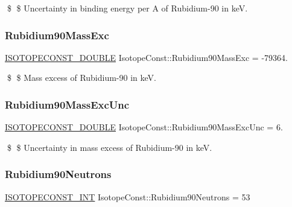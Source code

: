 \$ \$ Uncertainty in binding energy per A of Rubidium-\/90 in keV. \mbox{\label{group___isotope_const-_rubidium-_rb90_gaec19844685c3464457ba73291af59876}} 
\subsubsection{\texorpdfstring{Rubidium90\+Mass\+Exc}{Rubidium90MassExc}}
{\footnotesize\ttfamily \mbox{\hyperlink{group___isotope_const-_macros_ga8f45a7272ce02c0b4c65c44636ed719a}{I\+S\+O\+T\+O\+P\+E\+C\+O\+N\+S\+T\+\_\+\+D\+O\+U\+B\+LE}} Isotope\+Const\+::\+Rubidium90\+Mass\+Exc = -\/79364.}

\$ \$ Mass excess of Rubidium-\/90 in keV. \mbox{\label{group___isotope_const-_rubidium-_rb90_ga769179c50fbf1a01ff65d357ad84d692}} 
\subsubsection{\texorpdfstring{Rubidium90\+Mass\+Exc\+Unc}{Rubidium90MassExcUnc}}
{\footnotesize\ttfamily \mbox{\hyperlink{group___isotope_const-_macros_ga8f45a7272ce02c0b4c65c44636ed719a}{I\+S\+O\+T\+O\+P\+E\+C\+O\+N\+S\+T\+\_\+\+D\+O\+U\+B\+LE}} Isotope\+Const\+::\+Rubidium90\+Mass\+Exc\+Unc = 6.}

\$ \$ Uncertainty in mass excess of Rubidium-\/90 in keV. \mbox{\label{group___isotope_const-_rubidium-_rb90_ga16f1a8f315759ba7afa5da29315dc3f1}} 
\subsubsection{\texorpdfstring{Rubidium90\+Neutrons}{Rubidium90Neutrons}}
{\footnotesize\ttfamily \mbox{\hyperlink{group___isotope_const-_macros_ga5f18360b3e99483a35c32d789e62621c}{I\+S\+O\+T\+O\+P\+E\+C\+O\+N\+S\+T\+\_\+\+I\+NT}} Isotope\+Const\+::\+Rubidium90\+Neutrons = 53}

